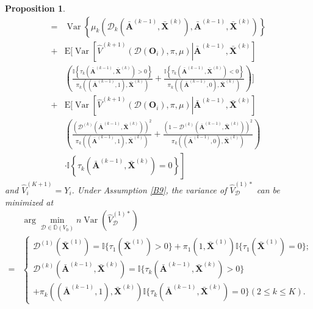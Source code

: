 \documentclass[11pt]{article}
\theoremstyle{referenceplain}
\newtheorem{proposition}{Proposition}[section]
\theoremstyle{referencedefinition}
\theoremstyle{referenceremark}
\begin{document}
\begin{proposition}
\begin{align*}
          =&\operatorname{Var}\left\{\mu_k\left(\mathcal{D}_k(\bar{\mathbf{A}}^{(k-1)}, \bar{\mathbf{X}}^{(k)}),\bar{\mathbf{A}}^{(k-1)}, \bar{\mathbf{X}}^{(k)}\right)\right\}\\
          +& \mathrm{E}\bigg[\operatorname{Var}\left[\widehat{V}^{(k+1)}(\mathcal{D}(\mathbf{O}_i),\pi,\mu)\left|\bar{\mathbf{A}}^{(k-1)}, \bar{\mathbf{X}}^{(k)}\right.\right]\\
          &\left(\frac{\mathbb{I}\left\{\tau_k\left(\bar{\mathbf{A}}^{(k-1)}, \bar{\mathbf{X}}^{(k)}\right)>0\right\}}{\pi_k\left((\bar{\mathbf{A}}^{(k-1)},1), \bar{\mathbf{X}}^{(k)}\right)}+\frac{\mathbb{I}\left\{\tau_k\left(\bar{\mathbf{A}}^{(k-1)}, \bar{\mathbf{X}}^{(k)}\right)<0\right\}}{\pi_k\left((\bar{\mathbf{A}}^{(k-1)},0), \bar{\mathbf{X}}^{(k)}\right)}\right)\bigg]\\
    +&\mathrm{E}\bigg[\operatorname{Var}\left[\widehat{V}^{(k+1)}(\mathcal{D}(\mathbf{O}_i),\pi,\mu)\left|\bar{\mathbf{A}}^{(k-1)}, \bar{\mathbf{X}}^{(k)}\right.\right]\\
    &\left(\frac{(\mathcal{D}^{(k)}(\bar{\mathbf{A}}^{(k-1)}, \bar{\mathbf{X}}^{(k)}))^2}{\pi_k\left((\bar{\mathbf{A}}^{(k-1)},1), \bar{\mathbf{X}}^{(k)}\right)}+\frac{(1-\mathcal{D}^{(k)}(\bar{\mathbf{A}}^{(k-1)}, \bar{\mathbf{X}}^{(k)}))^2}{\pi_k\left((\bar{\mathbf{A}}^{(k-1)},0), \bar{\mathbf{X}}^{(k)}\right)}\right) \\
    &\cdot\left.\mathbb{I}\left\{\tau_k\left(\bar{\mathbf{A}}^{(k-1)}, \bar{\mathbf{X}}^{(k)}\right)=0\right\}\right]
    \end{align*}
    and $\widehat{V}_i^{(K+1)}=Y_i$. Under Assumption \ref{B9}, the variance of $\widehat{V}_{\mathcal{D}}^{(1)*}$ can be minimized at
    \begin{align*}
        &\arg\min_{\mathcal{D}\in\bar{\mathbb{D}}(V_0)}n\operatorname{Var}\left(\widehat{V}_{\mathcal{D}}^{(1)*}\right)\\
=& \left\{ \begin{array}{ll}
 \mathcal{D}^{(1)}(\bar{\mathbf{X}}^{(1)})=\mathbb{I}\{\tau_1(\bar{\mathbf{X}}^{(1)})>0\}+\pi_1(1,\bar{\mathbf{X}}^{(1)})\mathbb{I}\{\tau_1(\bar{\mathbf{X}}^{(1)})=0\};\\
  \mathcal{D}^{(k)}(\bar{\mathbf{A}}^{(k-1)},\bar{\mathbf{X}}^{(k)})=\mathbb{I}\{\tau_k(\bar{\mathbf{A}}^{(k-1)},\bar{\mathbf{X}}^{(k)})>0\}\\+\pi_k((\bar{\mathbf{A}}^{(k-1)},1),\bar{\mathbf{X}}^{(k)})\mathbb{I}\{\tau_k(\bar{\mathbf{A}}^{(k-1)},\bar{\mathbf{X}}^{(k)})=0\} (2\leq k\leq K). 
\end{array} \right. 
    \end{align*} 
\end{proposition}
\end{document}
